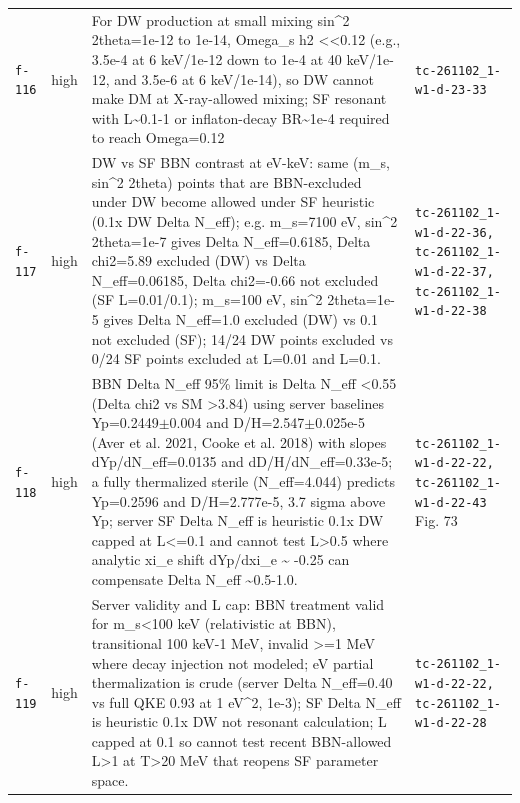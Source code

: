\documentclass[11pt,a4paper]{article}
\begin{document}
\begin{longtable}{@{}p{}p{}p{}p{}@{}}
\texttt{f-116} & high & For DW production at small mixing sin\textasciicircum{}2 2theta=1e-12 to 1e-14, Omega\_s h2 \textless{}\textless{}0.12 (e.g., 3.5e-4 at 6 keV/1e-12 down to 1e-4 at 40 keV/1e-12, and 3.5e-6 at 6 keV/1e-14), so DW cannot make DM at X-ray-allowed mixing; SF resonant with L\textasciitilde{}0.1-1 or inflaton-decay BR\textasciitilde{}1e-4 required to reach Omega=0.12 & \texttt{tc-261102\_\allowbreak{}1-w1-d-23-33} \\
\texttt{f-117} & high & DW vs SF BBN contrast at eV-keV: same (m\_s, sin\textasciicircum{}2 2theta) points that are BBN-excluded under DW become allowed under SF heuristic (0.1x DW Delta N\_eff); e.g. m\_s=7100 eV, sin\textasciicircum{}2 2theta=1e-7 gives Delta N\_eff=0.6185, Delta chi2=5.89 excluded (DW) vs Delta N\_eff=0.06185, Delta chi2=-0.66 not excluded (SF L=0.01/0.1); m\_s=100 eV, sin\textasciicircum{}2 2theta=1e-5 gives Delta N\_eff=1.0 excluded (DW) vs 0.1 not excluded (SF); 14/24 DW points excluded vs 0/24 SF points excluded at L=0.01 and L=0.1. & \texttt{tc-261102\_\allowbreak{}1-w1-d-22-36,\allowbreak{} tc-261102\_\allowbreak{}1-w1-d-22-37,\allowbreak{} tc-261102\_\allowbreak{}1-w1-d-22-38} \\
\texttt{f-118} & high & BBN Delta N\_eff 95\% limit is Delta N\_eff \textless{}0.55 (Delta chi2 vs SM \textgreater{}3.84) using server baselines Yp=0.2449$\pm$0.004 and D/H=2.547$\pm$0.025e-5 (Aver et al. 2021, Cooke et al. 2018) with slopes dYp/dN\_eff=0.0135 and dD/H/dN\_eff=0.33e-5; a fully thermalized sterile (N\_eff=4.044) predicts Yp=0.2596 and D/H=2.777e-5, 3.7 sigma above Yp; server SF Delta N\_eff is heuristic 0.1x DW capped at L\textless{}=0.1 and cannot test L\textgreater{}0.5 where analytic xi\_e shift dYp/dxi\_e \textasciitilde{} -0.25 can compensate Delta N\_eff \textasciitilde{}0.5-1.0. & \texttt{tc-261102\_\allowbreak{}1-w1-d-22-22,\allowbreak{} tc-261102\_\allowbreak{}1-w1-d-22-43} Fig. 73 \\
\texttt{f-119} & high & Server validity and L cap: BBN treatment valid for m\_s\textless{}100 keV (relativistic at BBN), transitional 100 keV-1 MeV, invalid \textgreater{}=1 MeV where decay injection not modeled; eV partial thermalization is crude (server Delta N\_eff=0.40 vs full QKE 0.93 at 1 eV\textasciicircum{}2, 1e-3); SF Delta N\_eff is heuristic 0.1x DW not resonant calculation; L capped at 0.1 so cannot test recent BBN-allowed L\textgreater{}1 at T\textgreater{}20 MeV that reopens SF parameter space. & \texttt{tc-261102\_\allowbreak{}1-w1-d-22-22,\allowbreak{} tc-261102\_\allowbreak{}1-w1-d-22-28} \\

\end{longtable}
\end{document}
